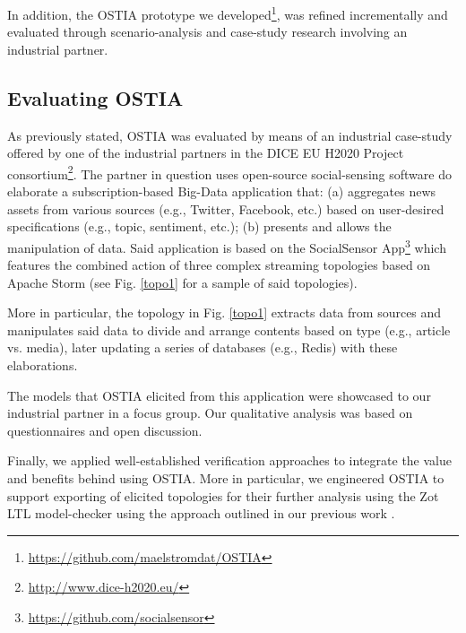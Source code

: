 In addition, the OSTIA prototype we developed\footnote{\url{https://github.com/maelstromdat/OSTIA}}, was refined incrementally and evaluated through scenario-analysis and case-study research \cite{casestudy} involving an industrial partner. 

\subsection{Evaluating OSTIA}

As previously stated, OSTIA was evaluated by means of an industrial case-study offered by one of the industrial partners in the DICE EU H2020 Project consortium\footnote{\url{http://www.dice-h2020.eu/}}. The partner in question uses open-source social-sensing software do elaborate a subscription-based Big-Data application that: (a) aggregates news assets from various sources (e.g., Twitter, Facebook, etc.) based on user-desired specifications (e.g., topic, sentiment, etc.); (b) presents and allows the manipulation of data. Said application is based on the SocialSensor App\footnote{\url{https://github.com/socialsensor}} which features the combined action of three complex streaming topologies based on Apache Storm (see Fig. \ref{topo1} for a sample of said topologies).

More in particular, the topology in Fig. \ref{topo1} extracts data from sources and manipulates said data to divide and arrange contents based on type (e.g., article vs. media), later updating a series of databases (e.g., Redis) with these elaborations.

The models that OSTIA elicited from this application were showcased to our industrial partner in a focus group. Our qualitative analysis was based on questionnaires and open discussion.


Finally, we applied well-established verification approaches to integrate the value and benefits behind using OSTIA. More in particular, we engineered OSTIA to support exporting of elicited topologies for their further analysis using the Zot LTL model-checker \cite{zot} using the approach outlined in our previous work \cite{icsoft}.